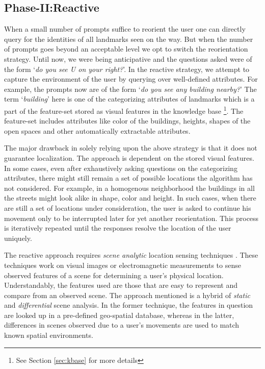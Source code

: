\documentclass{iitkthesis}
\begin{document}
\subsection*{Phase-II:Reactive}
When a small number of prompts suffice to reorient the user one can 
directly query for the identities of all landmarks seen on the way.
But when the number of prompts goes beyond an acceptable level
we opt to switch the reorientation strategy. Until now, we were 
being anticipative and the questions asked were of the form `\textit{do 
you see U on your right?}'. In the reactive strategy, we attempt to 
capture the environment of the user by querying over well-defined 
attributes. For example, the prompts now are of the form `\textit{do 
you see any building nearby?}' The term `\textit{building}' here is one 
of the categorizing attributes of landmarks which is a part of the 
feature-set stored as visual features in the knowledge base
\footnote{See Section \ref{sec:kbase} for more details}. The feature-set 
includes attributes like color of the buildings, heights, shapes of the 
open spaces and other automatically extractable attributes.

The major drawback in solely relying upon the above strategy is that it 
does not guarantee localization. The approach is dependent on the stored 
visual features. In some cases, even after exhaustively asking questions 
on the categorizing attributes, there might still remain a set of possible 
locations the algorithm has not considered. For example, in a 
homogenous neighborhood the buildings in all the streets might look alike in 
shape, color and height. In such cases, when there are still a set of 
locations under consideration, the user is asked to continue his movement 
only to be interrupted later for yet another reorientation. This process is
iteratively repeated until the responses resolve the location of the user uniquely.

The reactive approach requires \textit{scene analytic} 
location sensing techniques \cite{hightower}. These techniques work on 
visual images or electromagnetic measurements to sense observed features 
of a scene for determining a user's physical location. Understandably, 
the features used are those that are easy to represent and compare from 
an observed scene. The approach mentioned is a hybrid of \textit{static} 
and \textit{differential} scene analysis. In the former technique, the
features in question are looked up in a pre-defined geo-spatial database, 
whereas in the latter, differences in scenes observed due to a user's 
movements are used to match known spatial environments.
\end{document}
